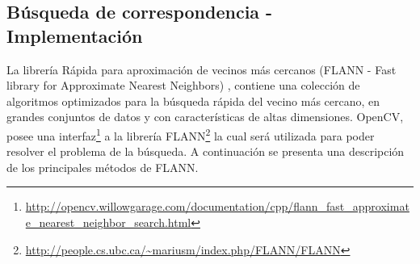 \documentclass[a4paper,11pt,spanish]{article}
\begin{document}



% 

\subsection{Búsqueda de correspondencia - Implementación}
La librería Rápida para aproximación de vecinos más cercanos (FLANN - Fast library for Approximate Nearest Neighbors) \cite{Muja09fastapproximate}, contiene una colección de algoritmos optimizados para la búsqueda rápida del vecino más cercano, en grandes conjuntos de datos y con  características de altas dimensiones.
OpenCV, posee una interfaz\footnote{\url{http://opencv.willowgarage.com/documentation/cpp/flann_fast_approximate_nearest_neighbor_search.html}} a la librería FLANN\footnote{\url{http://people.cs.ubc.ca/~mariusm/index.php/FLANN/FLANN}} la cual ser\'a utilizada para poder resolver el problema de la búsqueda. 
A continuación se presenta una descripción de los principales métodos de FLANN.
\end{document}
